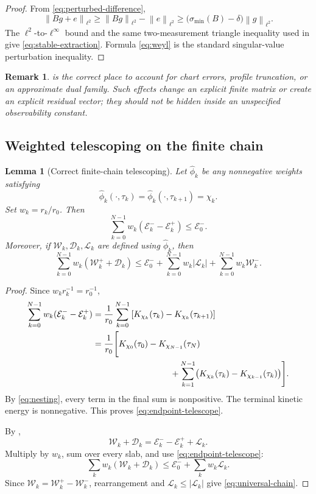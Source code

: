 \documentclass[11pt]{article}
\numberwithin{equation}{section}
\newtheorem{lemma}[theorem]{Lemma}
\newtheorem{remark}[theorem]{Remark}
\newcommand{\norm}[2]{\left\lVert #1\right\rVert_{#2}}
\newcommand{\W}{\mathcal W}
\newcommand{\D}{\mathcal D}
\newcommand{\Lk}{\mathcal L}
\newcommand{\Ek}{\mathcal E}
\begin{document}
\begin{proof}
From \eqref{eq:perturbed-difference},
\[
\norm{Bg+e}{\ell^2}
\ge
\norm{Bg}{\ell^2}-\norm{e}{\ell^2}
\ge
\bigl(\sigma_{\min}(B)-\delta\bigr)
\norm{g}{\ell^2}.
\]
The \(\ell^2\)-to-\(\ell^\infty\) bound and the same two-measurement triangle inequality used in  give \eqref{eq:stable-extraction}. Formula \eqref{eq:weyl} is the standard singular-value perturbation inequality.
\end{proof}

\begin{remark}
 is the correct place to account for chart errors, profile truncation, or an approximate dual family. Such effects change an explicit finite matrix or create an explicit residual vector; they should not be hidden inside an unspecified observability constant.
\end{remark}

\subsection{Weighted telescoping on the finite chain}\label{sec:chain}

\begin{lemma}[Correct finite-chain telescoping]\label{lem:telescoping}
Let \(\widehat\phi_k\) be any nonnegative weights satisfying
\[
\widehat\phi_k(\cdot,\tau_k)
=
\widehat\phi_k(\cdot,\tau_{k+1})
=
\chi_k.
\]
Set \(w_k=r_k/r_0\). Then
\begin{equation}\label{eq:endpoint-telescope}
\sum_{k=0}^{N-1}
w_k(\Ek_k^- -\Ek_k^+)
\le
\Ek_0^-.
\end{equation}
Moreover, if \(\W_k,\D_k,\Lk_k\) are defined using \(\widehat\phi_k\), then
\begin{equation}\label{eq:universal-chain}
\sum_{k=0}^{N-1}w_k(\W_k^++\D_k)
\le
\Ek_0^-
+
\sum_{k=0}^{N-1}w_k|\Lk_k|
+
\sum_{k=0}^{N-1}w_k\W_k^-.
\end{equation}
\end{lemma}

\begin{proof}
Since \(w_kr_k^{-1}=r_0^{-1}\),
\begin{align*}
\sum_{k=0}^{N-1}w_k(\Ek_k^- -\Ek_k^+)
&=
\frac1{r_0}
\sum_{k=0}^{N-1}
\left[
K_{\chi_k}(\tau_k)-K_{\chi_k}(\tau_{k+1})
\right]
\\
&=
\frac1{r_0}
\Bigg[
K_{\chi_0}(\tau_0)
-
K_{\chi_{N-1}}(\tau_N)
\\
&\hspace{3.2cm}
+
\sum_{k=1}^{N-1}
\bigl(
K_{\chi_k}(\tau_k)-K_{\chi_{k-1}}(\tau_k)
\bigr)
\Bigg].
\end{align*}
By \eqref{eq:nesting}, every term in the final sum is nonpositive. The terminal kinetic energy is nonnegative. This proves \eqref{eq:endpoint-telescope}.

By ,
\[
\W_k+\D_k
=
\Ek_k^- -\Ek_k^+ +\Lk_k.
\]
Multiply by \(w_k\), sum over every slab, and use \eqref{eq:endpoint-telescope}:
\[
\sum_k w_k(\W_k+\D_k)
\le
\Ek_0^-+\sum_k w_k\Lk_k.
\]
Since \(\W_k=\W_k^+-\W_k^-\), rearrangement and \(\Lk_k\le|\Lk_k|\) give \eqref{eq:universal-chain}.
\end{proof}
\end{document}
